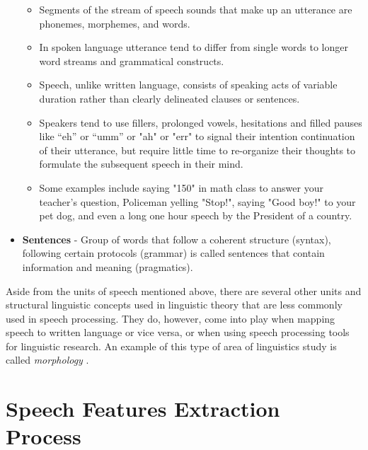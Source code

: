 \begin{itemize}
\begin{itemize}
        \item Segments of the stream of speech sounds that make up an utterance are phonemes, morphemes, and words.
        \item  In spoken language utterance tend to differ from single words to longer word streams and grammatical constructs.
        \item Speech, unlike written language, consists of speaking acts of variable duration rather than clearly delineated clauses or sentences. %
        \item Speakers tend to use fillers, prolonged vowels, hesitations and filled pauses like “eh” or “umm” or "ah" or "err" to signal their intention continuation of their utterance, but require little time to re-organize their thoughts to formulate the subsequent speech in their mind.
        \item Some examples include saying "150" in math class to answer your teacher's question, Policeman yelling "Stop!", saying "Good boy!" to your pet dog, and even a long one hour speech by the President of a country.      
    \end{itemize}
     \item \textbf{Sentences} - Group of words that follow a coherent structure (syntax), following certain protocols (grammar) is called sentences that contain information and meaning (pragmatics).
\end{itemize}

Aside from the units of speech mentioned above, there are several other units and structural linguistic concepts used in linguistic theory that are less commonly used in speech processing. They do, however, come into play when mapping speech to written language or vice versa, or when using speech processing tools for linguistic research. An example of this type of area of linguistics study is called \textit{morphology} \cite{backstrom_introduction_2022}. 

\section{Speech Features Extraction Process}

